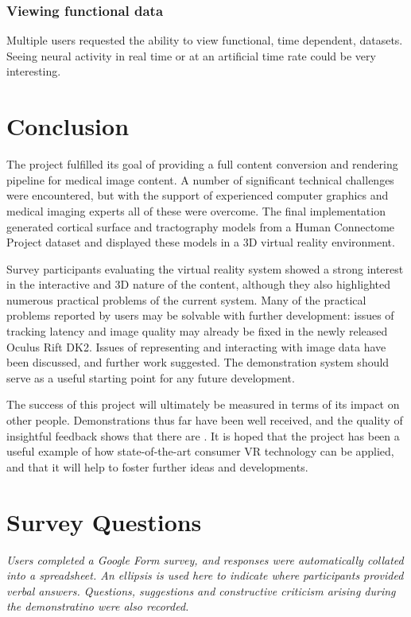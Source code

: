 \documentclass[MSc,paper=a4,pagesize=auto]{icldt}
\begin{document}
\subsection{Viewing functional data}
Multiple users requested the ability to view functional, time dependent, datasets. Seeing neural activity in real time or at an artificial time rate could be very interesting.

\chapter{Conclusion}
The project fulfilled its goal of providing a full content conversion and rendering pipeline for medical image content. A number of significant technical challenges were encountered, but with the support of experienced computer graphics and medical imaging experts all of these were overcome. The final implementation generated cortical surface and tractography models from a Human Connectome Project dataset and displayed these models in a 3D virtual reality environment. 

Survey participants evaluating the virtual reality system showed a strong interest in the interactive and 3D nature of the content, although they also highlighted numerous practical problems of the current system. Many of the practical problems reported by users may be solvable with further development: issues of tracking latency and image quality may already be fixed in the newly released Oculus Rift DK2. Issues of representing and interacting with image data have been discussed, and further work suggested. The demonstration system should serve as a useful starting point for any future development.

The success of this project will ultimately be measured in terms of its impact on other people. Demonstrations thus far have been well received, and the quality of insightful feedback shows that there are . It is hoped that the project has been a useful example of how state-of-the-art consumer VR technology can be applied, and that it will help to foster further ideas and developments. 
 

	

\appendix
\chapter{Survey Questions}

\noindent \textit{Users completed a Google Form survey, and responses were automatically collated into a spreadsheet. An ellipsis is used here to indicate where participants provided verbal answers. Questions, suggestions and constructive criticism arising during the demonstratino were also recorded.}
\end{document}

